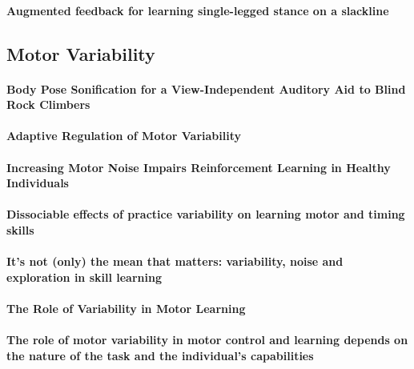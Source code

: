 \documentclass[11pt]{article}
\begin{document}
\paragraph{Augmented feedback for learning single-legged stance on a slackline} \citep{anlauff_augmented_2013}


\subsection{Motor Variability}
\paragraph{Body Pose Sonification for a View-Independent Auditory Aid to Blind Rock Climbers} \citep{ramsay_body_2020}

\paragraph{Adaptive Regulation of Motor Variability} \citep{dhawale_adaptive_2019}

\paragraph{Increasing Motor Noise Impairs Reinforcement Learning in Healthy Individuals} \citep{therrien_increasing_2018}

\paragraph{Dissociable effects of practice variability on learning motor and timing skills} \citep{caramiaux_dissociable_2018}

\paragraph{It's not (only) the mean that matters: variability, noise and exploration in skill learning} \citep{sternad_its_2018}

\paragraph{The Role of Variability in Motor Learning} \citep{dhawale_role_2017}

\paragraph{The role of motor variability in motor control and learning depends on the nature of the task and the individual’s capabilities} \citep{sanchez_role_2017}
\end{document}
